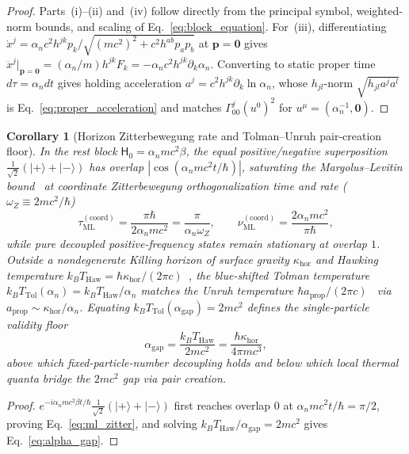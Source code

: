 \documentclass[aps,prd,onecolumn,tightenlines,nofootinbib,notitlepage,10pt,floatfix]{revtex4-2}
\theoremstyle{indentedtheorem}
\newtheorem{corollary}{Corollary}
\begin{document}
\begin{proof}
Parts~(i)--(ii) and~(iv) follow directly from the principal symbol, weighted-norm bounds, and scaling of Eq.~\eqref{eq:block_equation}. For~(iii), differentiating $\dot{x}^j=\alpha_n c^2 h^{jk}p_k/\sqrt{(mc^2)^2+c^2 h^{ab}p_a p_b}$ at $\mathbf{p}=\mathbf{0}$ gives $\ddot{x}^j|_{\mathbf{p}=\mathbf{0}}=(\alpha_n/m)h^{jk}F_k=-\alpha_n c^2 h^{jk}\partial_k\alpha_n$. Converting to static proper time $d\tau=\alpha_n dt$ gives holding acceleration $a^j=c^2 h^{jk}\partial_k\ln\alpha_n$, whose $h_{jl}$-norm $\sqrt{h_{jl}a^j a^l}$ is Eq.~\eqref{eq:proper_acceleration} and matches $\Gamma^j_{00}(u^0)^2$ for $u^\mu=(\alpha_n^{-1},\mathbf{0})$.
\end{proof}

\begin{corollary}[Horizon Zitterbewegung rate and Tolman--Unruh pair-creation floor]\label{cor:horizon_zitter_gap}
In the rest block $\mathsf{H}_0=\alpha_n mc^2\beta$, the equal positive/negative superposition $\tfrac{1}{\sqrt{2}}(|+\rangle+|-\rangle)$ has overlap $|\cos(\alpha_n mc^2 t/\hbar)|$, saturating the Margolus--Levitin bound~\citep{Margolus1998Maximum} at coordinate Zitterbewegung orthogonalization time and rate ($\omega_Z\equiv 2mc^2/\hbar$)
\begin{equation}
    \tau_\text{ML}^{(\text{coord})} = \frac{\pi\hbar}{2\alpha_n mc^2} = \frac{\pi}{\alpha_n\omega_Z} , \qquad \nu_\text{ML}^{(\text{coord})} = \frac{2\alpha_n mc^2}{\pi\hbar} ,
    \label{eq:ml_zitter}
\end{equation}
while pure decoupled positive-frequency states remain stationary at overlap $1$. Outside a nondegenerate Killing horizon of surface gravity $\kappa_\text{hor}$ and Hawking temperature $k_B T_\text{Haw}=\hbar\kappa_\text{hor}/(2\pi c)$~\citep{Hawking1975Particle}, the blue-shifted Tolman temperature $k_B T_\text{Tol}(\alpha_n)=k_B T_\text{Haw}/\alpha_n$ matches the Unruh temperature $\hbar a_\text{prop}/(2\pi c)$~\citep{Unruh1976Notes} via $a_\text{prop}\sim\kappa_\text{hor}/\alpha_n$. Equating $k_B T_\text{Tol}(\alpha_\text{gap})=2mc^2$ defines the single-particle validity floor
\begin{equation}
    \alpha_\text{gap} = \frac{k_B T_\text{Haw}}{2mc^2} = \frac{\hbar\kappa_\text{hor}}{4\pi mc^3} ,
    \label{eq:alpha_gap}
\end{equation}
above which fixed-particle-number decoupling holds and below which local thermal quanta bridge the $2mc^2$ gap via pair creation.
\end{corollary}
\begin{proof}
$e^{-i\alpha_n mc^2\beta t/\hbar}\tfrac{1}{\sqrt{2}}(|+\rangle+|-\rangle)$ first reaches overlap $0$ at $\alpha_n mc^2 t/\hbar=\pi/2$, proving Eq.~\eqref{eq:ml_zitter}, and solving $k_B T_\text{Haw}/\alpha_\text{gap}=2mc^2$ gives Eq.~\eqref{eq:alpha_gap}.
\end{proof}
\end{document}
